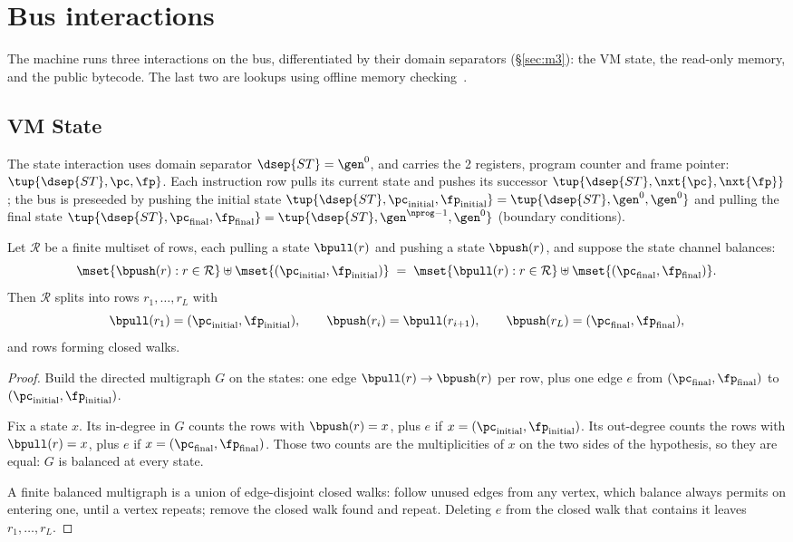 \section{Bus interactions}\label{sec:omc}

The machine runs three interactions on the bus, differentiated by their domain separators (\S\ref{sec:m3}): the VM state, the read-only memory, and the public bytecode. The last two are lookups using offline memory checking~\cite{BEGKN94}.

\subsection{VM State}\label{sec:state}

The state interaction uses domain separator $\dsep{ST} = \gen^{0}$, and carries the 2 registers, program counter and frame pointer: $\tup{\dsep{ST},\pc,\fp}$. Each instruction row pulls its current state and pushes its successor $\tup{\dsep{ST},\nxt{\pc},\nxt{\fp}}$; the bus is preseeded by pushing the initial state $\tup{\dsep{ST},\pc_{\mathrm{initial}},\fp_{\mathrm{initial}}} = \tup{\dsep{ST},\gen^0,\gen^0}$ and pulling the final state $\tup{\dsep{ST},\pc_{\mathrm{final}},\fp_{\mathrm{final}}} = \tup{\dsep{ST},\gen^{\nprog - 1},\gen^0}$ (boundary conditions).
\begin{proposition}\label{prop:walk}
Let $\mathcal R$ be a finite multiset of rows, each pulling a state $\bpull(r)$ and pushing a state $\bpush(r)$, and suppose the state channel balances:
\[
  \mset{\bpush(r):r\in\mathcal R}\uplus\mset{(\pc_{\mathrm{initial}},\fp_{\mathrm{initial}})}
  \;=\;\mset{\bpull(r):r\in\mathcal R}\uplus\mset{(\pc_{\mathrm{final}},\fp_{\mathrm{final}})} .
\]
Then $\mathcal R$ splits into rows $r_1,\dots,r_L$ with
\[
  \bpull(r_1)=(\pc_{\mathrm{initial}},\fp_{\mathrm{initial}}),\qquad \bpush(r_i)=\bpull(r_{i+1}),\qquad \bpush(r_L)=(\pc_{\mathrm{final}},\fp_{\mathrm{final}}),
\]
and rows forming closed walks.
\end{proposition}

\begin{proof}
Build the directed multigraph $G$ on the states: one edge $\bpull(r)\to \bpush(r)$ per row, plus one edge $e$ from $(\pc_{\mathrm{final}},\fp_{\mathrm{final}})$ to $(\pc_{\mathrm{initial}},\fp_{\mathrm{initial}})$.

Fix a state $x$. Its in-degree in $G$ counts the rows with $\bpush(r)=x$, plus $e$ if $x=(\pc_{\mathrm{initial}},\fp_{\mathrm{initial}})$. Its out-degree counts the rows with $\bpull(r)=x$, plus $e$ if $x=(\pc_{\mathrm{final}},\fp_{\mathrm{final}})$. Those two counts are the multiplicities of $x$ on the two sides of the hypothesis, so they are equal: $G$ is balanced at every state.

A finite balanced multigraph is a union of edge-disjoint closed walks: follow unused edges from any vertex, which balance always permits on entering one, until a vertex repeats; remove the closed walk found and repeat. Deleting $e$ from the closed walk that contains it leaves $r_1,\dots,r_L$.
\end{proof}

